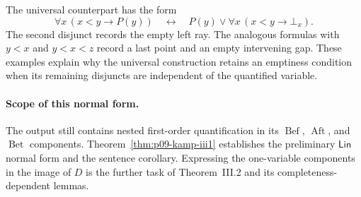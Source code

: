 The universal counterpart has the form
\[
 \forall x\,(x<y\longrightarrow P(y))
 \quad\longleftrightarrow\quad
 P(y)\lor\forall x\,(x<y\longrightarrow\bot_x).
\]
The second disjunct records the empty left ray.  The analogous formulas with
\(y<x\) and \(y<x<z\) record a last point and an empty intervening gap.
These examples explain why the universal construction retains an emptiness
condition when its remaining disjuncts are independent of the quantified
variable.

\paragraph{Scope of this normal form.}
The output still contains nested first-order quantification in its
\(\operatorname{Bef}\), \(\operatorname{Aft}\), and
\(\operatorname{Bet}\) components.  Theorem~\ref{thm:p09-kamp-iii1}
establishes the preliminary \(\mathsf{Lin}\) normal form and the sentence
corollary.  Expressing the one-variable components in the image of \(D\)
is the further task of Theorem~III.2 and its completeness-dependent lemmas.
